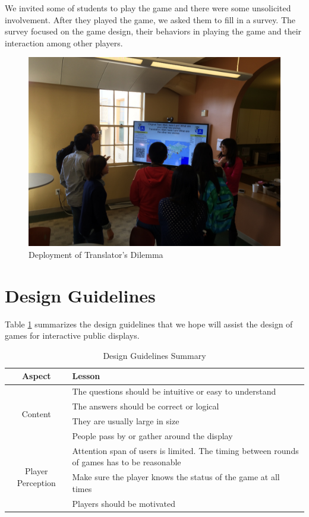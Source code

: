 \documentclass{sig-alternate}
\begin{document}
We invited some of students to play the game and there were some unsolicited involvement. After they played the game, we asked them to fill in a survey. The survey  focused on the game design, their behaviors in playing the game and their interaction among other players.

\begin{figure}
	\includegraphics[width=\linewidth]{deploy.jpg}
	\caption{Deployment of Translator's Dilemma}
	\label{us:deployment}
\end{figure}

\section{Design Guidelines}
Table \ref{table:design_guidlines_summary} summarizes the design guidelines that we hope will assist the design of games for interactive public displays.

\begin{table}[ht]
	\label{table:design_guidlines_summary}
	\begin{tabular*}{1\textwidth}{c | l}
 		\hline
		Aspect & Lesson\\ \hline
  		\multirow{4}{*}{Content} & The questions should be intuitive or easy to understand\\
 			& The answers should be correct or logical\\
 			& They are usually large in size\\
 			& People pass by or gather around the display\\ \hline
		\multirow{4}{*}{Player Perception} & Attention span of users is limited. The timing between rounds of games has to be reasonable
\\
 			& Make sure the player knows the status of the game at all times\\
 			& Players should be motivated\\ \hline	
	\end{tabular*}
	\caption{Design Guidelines Summary}
\end{table}
\end{document}
